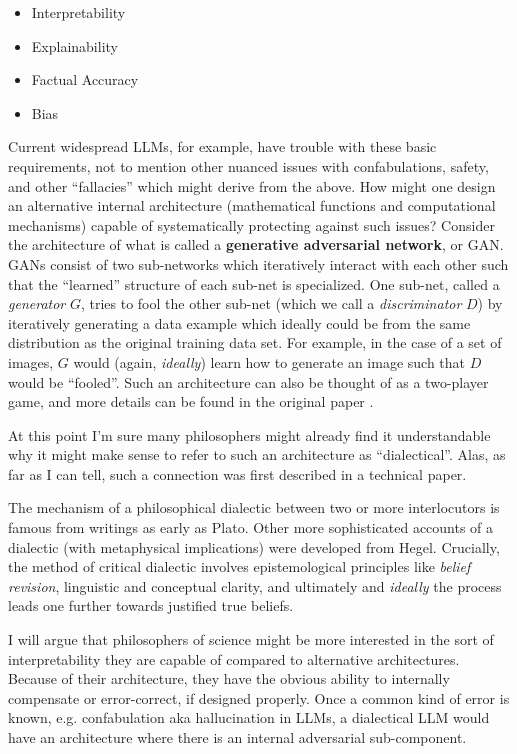 \documentclass[11pt, oneside]{article}   	%
\begin{document}
\begin{itemize}
    \item Interpretability
    \item Explainability
    \item Factual Accuracy
    \item Bias
\end{itemize}

Current widespread LLMs, for example, have trouble with these basic requirements, not to mention other nuanced issues with confabulations, safety, and other ``fallacies'' which might derive from the above.  How might one design an alternative internal architecture (mathematical functions and computational mechanisms) capable of systematically protecting against such issues?  
Consider the architecture of what is called a \textbf{generative adversarial network}, or GAN.  GANs consist of two sub-networks which iteratively interact with each other such that the ``learned'' structure of each sub-net is specialized.  One sub-net, called a \emph{generator} $G$, tries to fool the other sub-net (which we call a \emph{discriminator} $D$) by iteratively generating a data example which ideally could be from the same distribution as the original training data set.  For example, in the case of a set of images, $G$ would (again, \emph{ideally}) learn how to generate an image such that $D$ would be ``fooled''.  Such an architecture can also be thought of as a two-player game, and more details can be found in the original paper .


At this point I'm sure many philosophers might already find it understandable why it might make sense to refer to such an architecture as ``dialectical''.  Alas, as far as I can tell, such a connection was first described in a technical paper.

The mechanism of a philosophical dialectic between two or more interlocutors is famous from writings as early as Plato.  Other more sophisticated accounts of a dialectic (with metaphysical implications) were developed from Hegel.  \citep{sep-hegel-dialectics}  Crucially, the method of critical dialectic involves epistemological principles like \emph{belief revision}, linguistic and conceptual clarity, and ultimately and \emph{ideally} the process leads one further towards justified true beliefs. 





I will argue that philosophers of science might be more interested in the sort of interpretability they are capable of compared to alternative architectures.  Because of their architecture, they have the obvious ability to internally compensate or error-correct, if designed properly.  Once a common kind of error is known, e.g. confabulation aka hallucination in LLMs, a dialectical LLM would have an architecture where there is an internal adversarial sub-component.
\end{document}
